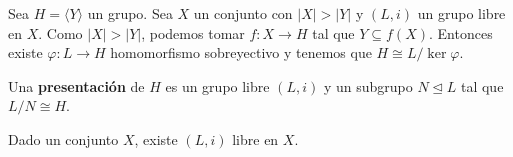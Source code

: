 \documentclass[bibtex, anon]{TEMat-article}
\providecommand{\gene}[1]{\langle{#1}\rangle}
\begin{document}
\begin{observacion}\label{4.2}
	Sea $H=\gene{Y}$ un grupo. Sea $X$ un conjunto con $|X|>|Y|$ y $(L,i)$ un grupo libre en $X$. Como $|X|>|Y|$, podemos tomar $f:X\to H$ tal que $Y\subseteq f(X)$. Entonces existe $\varphi:L\to H$ homomorfismo sobreyectivo y tenemos que $H\cong L/\ker\varphi$.
\end{observacion}

\begin{definicion}
	Una \textbf{presentación} de $H$ es un grupo libre $(L,i)$ y un subgrupo $N\trianglelefteq L$ tal que $L/N\cong H$. 
\end{definicion}

\begin{teorema}\cite[\S II.5]{Aluffi}
	Dado un conjunto $X$, existe $(L,i)$ libre en $X$. %
\end{teorema}
\end{document}
